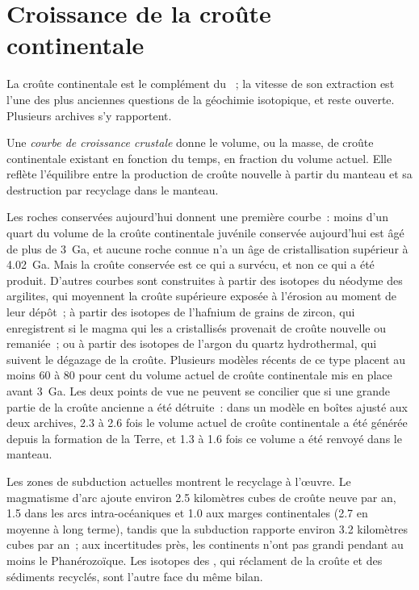 \section{Croissance de la croûte continentale}

La croûte continentale est le complément du ~; la vitesse de son extraction
est l'une des plus anciennes questions de la géochimie isotopique, et reste
ouverte. Plusieurs archives s'y rapportent.

\begin{definition}\label{def:b2:isotope-geochemistry:growth}
Une \emph{courbe de croissance crustale} donne le volume, ou la
masse, de croûte continentale existant en fonction du temps, en fraction du
volume actuel. Elle reflète l'équilibre entre la production de croûte nouvelle à partir
du manteau et sa destruction par recyclage dans le manteau.
\end{definition}

Les roches conservées aujourd'hui donnent une première courbe~: moins d'un quart du volume
de la croûte continentale juvénile conservée aujourd'hui est âgé de plus de \qty{3}{Ga}, et
aucune roche connue n'a un âge de cristallisation supérieur à \qty{4.02}{Ga}. Mais la
croûte conservée est ce qui a survécu, et non ce qui a été produit. D'autres courbes sont construites à partir
des isotopes du néodyme des argilites, qui moyennent la croûte supérieure exposée à
l'érosion au moment de leur dépôt~; à partir des isotopes de l'hafnium de grains de zircon, qui
enregistrent si le magma qui les a cristallisés provenait de croûte nouvelle ou remaniée~;
ou à partir des isotopes de l'argon du quartz hydrothermal, qui suivent le dégazage de la croûte.
Plusieurs modèles récents de ce type placent au moins 60
à 80 pour cent du volume actuel de croûte continentale mis en place avant
\qty{3}{Ga}. Les deux points de vue ne peuvent se concilier que si une grande partie de la croûte ancienne a été détruite~:
dans un modèle en boîtes ajusté aux deux archives, 2.3 à 2.6 fois le volume actuel de croûte continentale
a été générée depuis la formation de la Terre, et 1.3 à 1.6 fois ce volume a été renvoyé dans le
manteau.

Les zones de subduction actuelles montrent le recyclage à l'œuvre. Le magmatisme d'arc ajoute
environ 2.5 kilomètres cubes de croûte neuve par an, 1.5 dans les arcs intra-océaniques et
1.0 aux marges continentales (2.7 en moyenne à long terme), tandis que la subduction
rapporte environ 3.2 kilomètres cubes par an~; aux incertitudes près,
les continents n'ont pas grandi pendant au moins le Phanérozoïque. Les isotopes des ,
qui réclament de la croûte et des sédiments recyclés, sont l'autre face
du même bilan.

